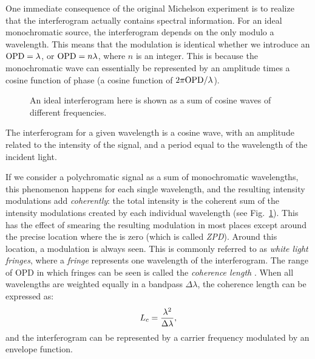 One immediate consequence of the original Michelson experiment is to realize that the interferogram actually contains spectral information. For an ideal monochromatic source, the interferogram depends on the \OPD only modulo a wavelength. This means that the modulation is identical whether we introduce an $\textrm{OPD} = \lambda$, or $\textrm{OPD} = n\lambda$, where $n$ is an integer. This is because the monochromatic wave can essentially be represented by an amplitude times a cosine function of phase (a cosine function of $2\pi\textrm{OPD}/\lambda$).

\begin{figure}[!ht]
	\centering
	
	\caption[Simple interferogram]{An ideal interferogram here is shown as a sum of cosine waves of different frequencies.}
	\label{fig:interferogram}
    \end{figure}


The interferogram for a given wavelength is a cosine wave, with an amplitude related to the intensity of the signal, and a period equal to the wavelength of the incident light.

If we consider a polychromatic signal as a sum of monochromatic wavelengths, this phenomenon happens for each single wavelength, and the resulting intensity modulations add \textit{coherently}: the total intensity is the coherent sum of the intensity modulations created by each individual wavelength (see Fig.~\ref{fig:interferogram}). This has the effect of smearing the resulting modulation in most places except around the precise location where the \OPD is zero (which is called \textit{ZPD}). Around this location, a modulation is always seen. This is commonly referred to as \textit{white light fringes}, where a \textit{fringe} represents one wavelength of the interferogram. The range of OPD in which fringes can be seen is called the \textit{coherence length} \Lc. When all wavelengths are weighted equally in a bandpass $\Delta\lambda$, the coherence length can be expressed as:
\begin{equation}
L_c = \frac{\lambda^2}{\Delta\lambda},
\end{equation}
and the interferogram can be represented by a carrier frequency modulated by an envelope function.



